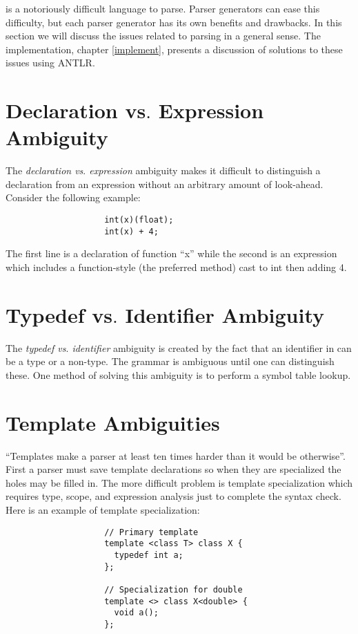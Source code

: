 
{\CPP} is a notoriously difficult language to 
parse\cite{bodin94,knapen99,lilley97,reiss95,Roskind89}.
Parser generators can ease this difficulty,
but each parser generator has its own benefits and drawbacks.
In this section we will discuss the issues related to parsing {\CPP} in a general sense.
The implementation, chapter \ref{implement}, presents a discussion 
of solutions to these issues using ANTLR.

\section{Declaration vs$.$ Expression Ambiguity}
The {\em declaration vs$.$ expression} ambiguity makes it difficult
to distinguish a declaration from an expression 
without an arbitrary amount of look-ahead.  Consider the
following example:

\singlespace
\begin{verbatim}
                    int(x)(float);
                    int(x) + 4;
\end{verbatim}
\doublespace

The first line is a declaration of function ``x'' while the second is an 
expression which includes a function-style (the preferred method) cast to int then adding 4.

\section{Typedef vs$.$ Identifier Ambiguity}
The {\em typedef vs$.$ identifier} ambiguity is created by the fact that an identifier in {\CPP} can be a type or a non-type.  The {\CPP} grammar is ambiguous until one can distinguish these.  One method of solving this ambiguity is to perform a symbol table lookup.

\section{Template Ambiguities}
``Templates make a {\CPP} parser at least ten times harder than it would be otherwise''\cite{lilley97}.  First a parser must save template declarations so when they are specialized the holes may be filled in.  The more difficult problem is template specialization which requires type, scope, and expression analysis just to complete the syntax check.  Here is an example of template specialization:

\singlespace
\begin{verbatim}
                    // Primary template
                    template <class T> class X {
                      typedef int a;
                    };

                    // Specialization for double
                    template <> class X<double> {
                      void a();
                    };
\end{verbatim}
\doublespace

